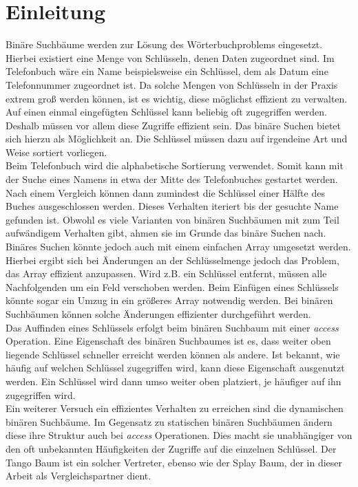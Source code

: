 \documentclass[a4paper,12pt]{article}
\begin{document}
\newpage
\section{Einleitung}
Binäre Suchbäume werden zur Lösung des Wörterbuchproblems eingesetzt. Hierbei existiert eine Menge von Schlüsseln, denen Daten zugeordnet sind. Im Telefonbuch wäre ein Name beispielsweise ein Schlüssel, dem als Datum eine Telefonnummer zugeordnet ist. Da solche Mengen von Schlüsseln in der Praxis extrem groß werden können, ist es wichtig, diese möglichst effizient zu verwalten. Auf einen einmal eingefügten Schlüssel kann beliebig oft zugegriffen werden. Deshalb müssen vor allem diese Zugriffe effizient sein. Das binäre Suchen bietet sich hierzu als Möglichkeit an. Die Schlüssel müssen dazu auf irgendeine Art und Weise sortiert vorliegen.\\ Beim Telefonbuch wird die alphabetische Sortierung verwendet. Somit kann mit der Suche eines Namens in etwa der Mitte des Telefonbuches gestartet werden. Nach einem Vergleich können dann zumindest die Schlüssel einer Hälfte des Buches ausgeschlossen werden. Dieses Verhalten iteriert bis der gesuchte Name gefunden ist. Obwohl es viele Varianten von binären Suchbäumen mit zum Teil aufwändigem Verhalten gibt, ahmen sie im Grunde das binäre Suchen nach.\\
Binäres Suchen könnte jedoch auch mit einem einfachen Array umgesetzt werden. Hierbei ergibt sich bei Änderungen an der Schlüsselmenge jedoch das Problem, das Array effizient anzupassen. Wird z.B. ein Schlüssel entfernt, müssen alle Nachfolgenden um ein Feld verschoben werden. Beim Einfügen eines Schlüssels könnte sogar ein Umzug in ein größeres Array notwendig werden. Bei binären Suchbäumen können solche Änderungen effizienter durchgeführt werden.\\ 
Das Auffinden eines Schlüssels erfolgt beim binären Suchbaum  mit einer \mbox{\textit{access}} Operation.  Eine Eigenschaft des binären Suchbaumes ist es, dass weiter oben liegende Schlüssel schneller erreicht werden können als andere. Ist bekannt, wie häufig auf welchen Schlüssel zugegriffen wird, kann diese Eigenschaft ausgenutzt werden. Ein Schlüssel wird dann umso weiter oben platziert, je häufiger auf ihn zugegriffen wird. \\
Ein weiterer Versuch ein  effizientes Verhalten zu erreichen sind die dynamischen binären Suchbäume. Im Gegensatz zu statischen binären Suchbäumen ändern diese ihre Struktur auch bei \textit{access} Operationen. Dies macht sie unabhängiger von den oft unbekannten Häufigkeiten der Zugriffe auf die einzelnen Schlüssel. Der Tango Baum ist ein solcher Vertreter, ebenso wie der Splay Baum, der in dieser Arbeit als Vergleichspartner dient.
\end{document}
